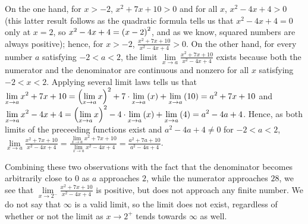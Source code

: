 \documentclass{ximera}
\begin{document}
\begin{exercise}
\begin{hint}
    On the one hand, for $x>-2$, $x^2+7x+10>0$ and for all $x$, $x^2-4x+4>0$ (this latter result follows as the quadratic formula tells us that $x^2-4x+4=0$ only at $x=2$, so $x^2-4x+4=\left(x-2\right)^2$, and as we know, squared numbers are always positive); hence, for $x>-2$, $\frac{x^2+7x+10}{x^2-4x+4}>0$. On the other hand, for every number $a$ satisfying $-2<a<2$, the limit $\lim\limits_{x\to a}\frac{x^2+7x+10}{x^2-4x+4}$ exists because both the numerator and the denominator are continuous and nonzero for all $x$ satisfying $-2<x<2$. Applying several limit laws tells us that $\lim\limits_{x\to a}x^2+7x+10=\p{\lim\limits_{x\to a}x}^2+7\cdot\lim\limits_{x\to a}\p{x}+\lim\limits_{x\to a}\p{10}=a^2+7x+10$ and $\lim\limits_{x\to a}x^2-4x+4=\p{\lim\limits_{x\to a}x}^2-4\cdot\lim\limits_{x\to a}\p{x}+\lim\limits_{x\to a}\p{4}=a^2-4a+4$. Hence, as both limits of the preceeding functions exist and $a^2-4a+4\ne0$ for  $-2<a<2$, $\lim\limits_{x\to a}\frac{x^2+7x+10}{x^2-4x+4}=\frac{\lim\limits_{x\to a}x^2+7x+10}{\lim\limits_{x\to a}x^2-4x+4}=\frac{a^2+7a+10}{a^2-4a+4}$.
    
    Combining these two observations with the fact that the denominator becomes arbitrarily close to $0$ as $a$ approaches $2$, while the numerator approaches $28$, we see that $\lim\limits_{x\to 2^{-}}\frac{x^2+7x+10}{x^2-4x+4}$ is positive, but does not approach any finite number. We do not say that $\infty$ is a valid limit, so the limit does not exist, regardless of whether or not the limit as $x\to2^{+}$ tends towards $\infty$ as well.
    \end{hint}
\end{exercise}
\end{document}

